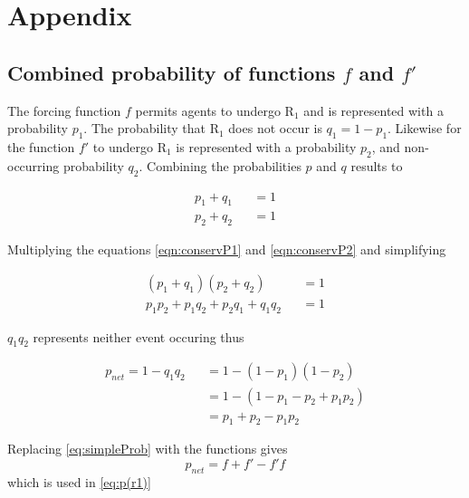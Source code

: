 \chapter{Appendix}
\label{appendix}

\section{Combined probability of functions $f$ and $f'$}
\label{apndx:prob}

\hspace{\parindent} The forcing function $f$ permits agents to undergo $\mathrm{R_{1}}$ and is represented with a probability $p_{1}$.
The probability that $\mathrm{R_{1}}$ does not occur is $q_{1} = 1 - p_{1}$.
Likewise for the function $f'$ to undergo $\mathrm{R_{1}}$ is represented with a probability $p_{2}$, and non-occurring probability $q_{2}$.
Combining the probabilities $p$ and $q$ results to

\begin{eqnarray}
\label{eqn:conservP1}
p_{1} + q_{1} &&= 1 \\
\label{eqn:conservP2}
p_{2} + q_{2} &&= 1
\end{eqnarray}

Multiplying the equations \eqref{eqn:conservP1} and \eqref{eqn:conservP2} and simplifying

\begin{eqnarray}
(p_{1} + q_{1})(p_{2} + q_{2}) &&= 1 \\
p_{1}p_{2} + p_{1}q_{2} + p_{2}q_{1} + q_{1}q_{2} &&= 1
\end{eqnarray}

$q_{1}q_{2}$ represents neither event occuring thus

\begin{eqnarray}
p_{net} = 1 - q_{1}q_{2} &&= 1 - (1-p_{1})(1-p_{2}) \\
&&= 1 - (1 - p_{1} - p_{2} + p_{1}p_{2}) \\
&&= p_{1} + p_{2} - p_{1}p_{2}
\label{apndx:simpleProb}
\end{eqnarray}

Replacing \eqref{eq:simpleProb} with the functions gives
\begin{equation}
p_{net} = f + f' - f'f
\end{equation}
which is used in \eqref{eq:p(r1)}

\newpage
